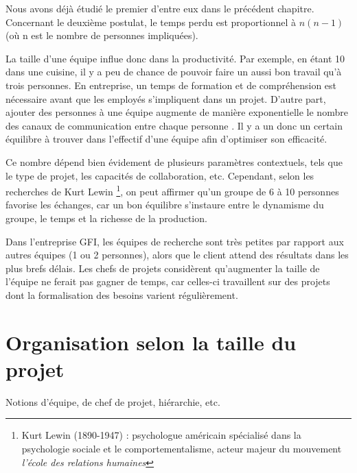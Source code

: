 Nous avons déjà étudié le premier d'entre eux dans le précédent chapitre. Concernant le deuxième postulat, le temps perdu est proportionnel à $ n(n-1) $ (où n est le nombre de personnes impliquées).

La taille d'une équipe influe donc dans la productivité. Par exemple, en étant 10 dans une cuisine, il y a peu de chance de pouvoir faire un aussi bon travail qu'à trois personnes. En entreprise, un temps de formation et de compréhension est nécessaire avant que les employés s'impliquent dans un projet. D'autre part, ajouter des personnes à une équipe augmente de manière exponentielle le nombre des canaux de communication entre chaque personne . Il y a un donc un certain équilibre à trouver dans l'effectif d'une équipe afin d'optimiser son efficacité.

Ce nombre dépend bien évidement de plusieurs paramètres contextuels, tels que le type de projet, les capacités de collaboration, etc. Cependant, selon les recherches de Kurt Lewin \footnote{Kurt Lewin (1890-1947) : psychologue américain spécialisé dans la psychologie sociale et le comportementalisme, acteur majeur du mouvement \textit{l'école des relations humaines}}, on peut affirmer qu'un groupe de 6 à 10 personnes favorise les échanges, car un bon équilibre s'instaure entre le dynamisme du groupe, le temps et la richesse de la production.


\begin{app}
Dans l'entreprise GFI, les équipes de recherche sont très petites par rapport aux autres équipes (1 ou 2 personnes), alors que le client attend des résultats dans les plus brefs délais. Les chefs de projets considèrent qu'augmenter la taille de l'équipe ne ferait pas gagner de temps, car celles-ci travaillent sur des projets dont la formalisation des besoins varient régulièrement.
\end{app}

\section{Organisation selon la taille du projet}

Notions d'équipe, de chef de projet, hiérarchie, etc.

